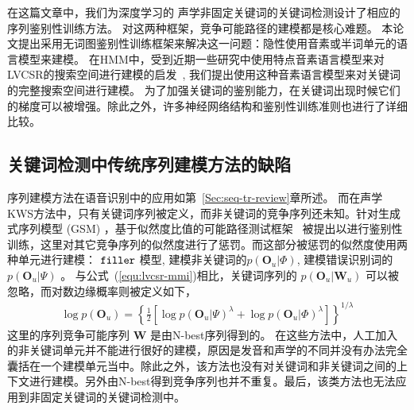 在这篇文章中，我们为深度学习的 声学非固定关键词的关键词检测设计了相应的序列鉴别性训练方法。
%
对这两种框架，竞争可能路径的建模都是核心难题。
本论文提出采用无词图鉴别性训练框架来解决这一问题：隐性使用音素或半词单元的语言模型来建模。
在HMM中，受到近期一些研究中使用特点音素语言模型来对LVCSR的搜索空间进行建模的启发~\cite{povey2016purely,chen2006advances},  我们提出使用这种音素语言模型来对关键词的完整搜索空间进行建模。
为了加强关键词的鉴别能力，在关键词出现时候它们的梯度可以被增强。除此之外，许多神经网络结构和鉴别性训练准则也进行了详细比较。



\subsection{关键词检测中传统序列建模方法的缺陷}

序列建模方法在语音识别中的应用如第~\ref{Sec:seq-tr-review}章所述。
而在声学KWS方法中，只有关键词序列被定义，而非关键词的竞争序列还未知。针对生成式序列模型 (GSM) ，基于似然度比值的可能路径测试框架~\cite{sukkar1996utterance} 被提出以进行鉴别性训练，这里对其它竞争序列的似然度进行了惩罚。而这部分被惩罚的似然度使用两种单元进行建模： $\tt filler$ 模型, 建模非关键词的$p(\mathbf{O}_u|\Phi)$, 建模错误识别词的 $p(\mathbf{O}_u|\Psi)$ 。 与公式~(\ref{equ:lvcsr-mmi})相比，关键词序列的  $p(\mathbf{O}_u|\mathbf{W}_u)$ 可以被忽略，而对数边缘概率则被定义如下，
\begin{equation}
\label{equ:wbmve-po}
\begin{split}
\log p(\mathbf{O}_u)=\left\{\frac{1}{2}[\log p(\mathbf{O}_u|\Psi)^\lambda + \log p(\mathbf{O}_u|\Phi)^\lambda]\right\}^{1/\lambda}
\end{split}
\end{equation}
这里的序列竞争可能序列 $\mathbf{W}$ 是由N-best序列得到的。
在这些方法中，人工加入的非关键词单元并不能进行很好的建模，原因是发音和声学的不同并没有办法完全囊括在一个建模单元当中。除此之外，该方法也没有对关键词和非关键词之间的上下文进行建模。另外由N-best得到竞争序列也并不重复。最后，该类方法也无法应用到非固定关键词的关键词检测中。



